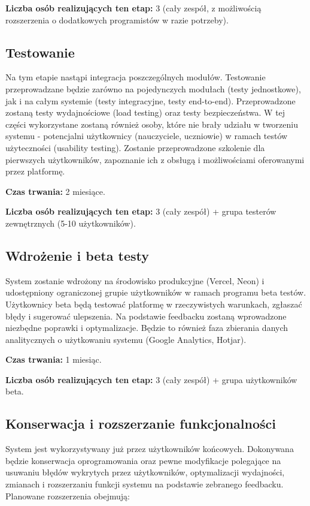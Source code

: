 \documentclass[12pt,a4paper]{article}
\begin{document}
\textbf{Liczba osób realizujących ten etap:} 3 (cały zespół, z możliwością rozszerzenia o dodatkowych programistów w razie potrzeby).

\subsection{Testowanie}

Na tym etapie nastąpi integracja poszczególnych modułów. Testowanie przeprowadzane będzie zarówno na pojedynczych modułach (testy jednostkowe), jak i na całym systemie (testy integracyjne, testy end-to-end). Przeprowadzone zostaną testy wydajnościowe (load testing) oraz testy bezpieczeństwa. W tej części wykorzystane zostaną również osoby, które nie brały udziału w tworzeniu systemu - potencjalni użytkownicy (nauczyciele, uczniowie) w ramach testów użyteczności (usability testing). Zostanie przeprowadzone szkolenie dla pierwszych użytkowników, zapoznanie ich z obsługą i możliwościami oferowanymi przez platformę.

\textbf{Czas trwania:} 2 miesiące.

\textbf{Liczba osób realizujących ten etap:} 3 (cały zespół) + grupa testerów zewnętrznych (5-10 użytkowników).

\subsection{Wdrożenie i beta testy}

System zostanie wdrożony na środowisko produkcyjne (Vercel, Neon) i udostępniony ograniczonej grupie użytkowników w ramach programu beta testów. Użytkownicy beta będą testować platformę w rzeczywistych warunkach, zgłaszać błędy i sugerować ulepszenia. Na podstawie feedbacku zostaną wprowadzone niezbędne poprawki i optymalizacje. Będzie to również faza zbierania danych analitycznych o użytkowaniu systemu (Google Analytics, Hotjar).

\textbf{Czas trwania:} 1 miesiąc.

\textbf{Liczba osób realizujących ten etap:} 3 (cały zespół) + grupa użytkowników beta.

\subsection{Konserwacja i rozszerzanie funkcjonalności}

System jest wykorzystywany już przez użytkowników końcowych. Dokonywana będzie konserwacja oprogramowania oraz pewne modyfikacje polegające na usuwaniu błędów wykrytych przez użytkowników, optymalizacji wydajności, zmianach i rozszerzaniu funkcji systemu na podstawie zebranego feedbacku. Planowane rozszerzenia obejmują:
\end{document}
